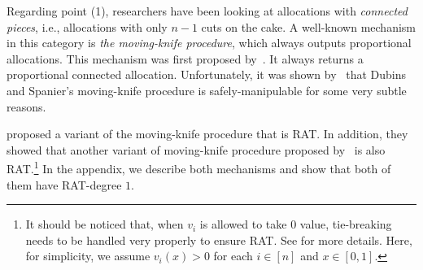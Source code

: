 Regarding point (1), researchers have been looking at allocations with \emph{connected pieces}, i.e., allocations with only $n-1$ cuts on the cake.
A well-known mechanism in this category is \emph{the moving-knife procedure}, which always outputs proportional allocations.
This mechanism was first proposed by~\citet{dubins1961cut}. It always returns a proportional connected allocation.
Unfortunately, it was shown by~\citet{BU2023Rat} that Dubins and Spanier's moving-knife procedure is safely-manipulable for some very subtle reasons.

\citet{BU2023Rat} proposed a variant of the moving-knife procedure that is RAT.
In addition, they showed that another variant of moving-knife procedure proposed by~\citet{ortega2022obvious} is also RAT.\footnote{It should be noticed that, when $v_i$ is allowed to take $0$ value, tie-breaking needs to be handled very properly to ensure RAT. See \citet{BU2023Rat} for more details. Here, for simplicity, we assume $v_i(x)>0$ for each $i\in[n]$ and $x\in[0,1]$.}
In the appendix, we describe both mechanisms and show that both of them have RAT-degree $1$.
%

